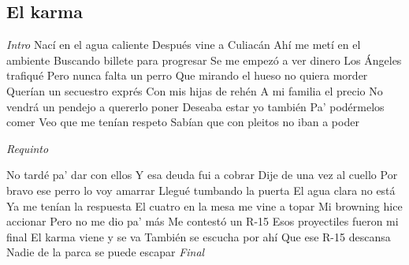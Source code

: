 \subsection{El karma}
\noindent

\vspace{1cm}

\begin{guitar}
	\begin{multicols}{2}
		\textit{Intro}
Nací en el agua caliente
Después vine a Culiacán
Ahí me metí en el ambiente
Buscando billete para progresar
Se me empezó a ver dinero
Los Ángeles trafiqué
Pero nunca falta un perro
Que mirando el hueso no quiera morder
Querían un secuestro exprés
Con mis hijas de rehén
A mi familia el precio
No vendrá un pendejo a quererlo poner
Deseaba estar yo también
Pa' podérmelos comer
Veo que me tenían respeto
Sabían que con pleitos no iban a poder
\par
\textit{Requinto}
\par

No tardé pa' dar con ellos
Y esa deuda fui a cobrar
Dije de una vez al cuello
Por bravo ese perro lo voy amarrar
Llegué tumbando la puerta
El agua clara no está
Ya me tenían la respuesta
El cuatro en la mesa me vine a topar
Mi browning hice accionar
Pero no me dio pa' más
Me contestó un R-15
Esos proyectiles fueron mi final
El karma viene y se va
También se escucha por ahí
Que ese R-15 descansa
Nadie de la parca se puede escapar
		\textit{Final}
	\end{multicols}
\end{guitar}
